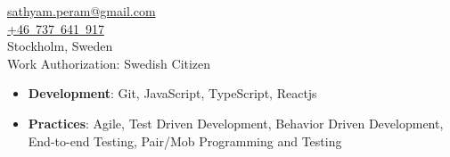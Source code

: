 
\begin{minipage}[t]{0.29\textwidth} %
\colorbox{cvblue!90}{\begin{minipage}[t][5mm][t]{\textwidth}\null\hfill\null\end{minipage}}

\vspace{-0.3ex} %
\colorbox{cvblue!90}
{\color{white}  %
    \textwidth\relax%

    \begin{minipage}[t][293mm][t]{0.82\textwidth}
    \raggedright
    \vspace*{2.5ex}




    \Large
    \vspace*{0.5ex} %
    \href{mailto:sathyam.peram@gmail.com}{\color{sidebarlinkcolor}sathyam.peram@gmail.com} \\
    \href{tel:+46737641917}{\color{sidebarlinkcolor}+46~737~641~917} \\
    Stockholm, Sweden \\
    \vspace{0.5em}
    Work Authorization: Swedish Citizen

    \Large
    \Large
    \begin{itemize}
    \setlength{\itemsep}{1.5em}
        \item \textbf{Development}: Git, JavaScript, TypeScript, Reactjs
        \item \textbf{Practices}: Agile, Test Driven Development, Behavior Driven Development, End-to-end Testing, Pair/Mob Programming and Testing
    \end{itemize}


\end{minipage}}
\end{minipage}
